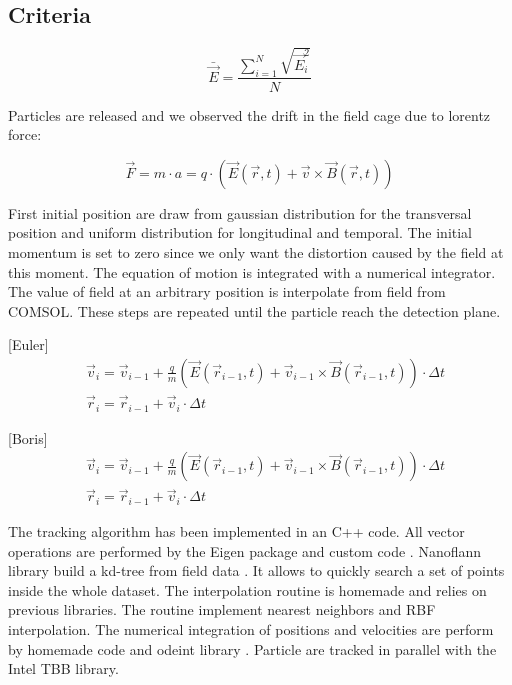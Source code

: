 \begin{refsection}
	\subsection{Criteria}

	\begin{equation}
		\bar{\vec{E}} = \frac{\sum_{i=1}^{N}\sqrt{\vec{E}_{i}^{2}}}{N}
	\end{equation}

	Particles are released and we observed the drift in the field cage due to lorentz force:

	\begin{equation}
		\vec{F} = m \cdot a = q \cdot (\vec{E}(\vec{r},t) + \vec{v} \times \vec{B}(\vec{r},t))
	\end{equation}

	First initial position are draw from gaussian distribution for the transversal position and uniform distribution for longitudinal and temporal. The initial momentum is set to zero since we only want the distortion caused by the field at this moment. The equation of motion is integrated with a numerical integrator. The value of field at an arbitrary position is interpolate from field from COMSOL. These steps are repeated until the particle reach the detection plane.

	[Euler]
	\begin{align}
		 & \vec{v}_{i} = \vec{v}_{i-1} + \frac{q}{m}(\vec{E}(\vec{r}_{i-1},t) + \vec{v}_{i-1} \times \vec{B}(\vec{r}_{i-1},t)) \cdot \Delta t \\
		 & \vec{r}_{i} = \vec{r}_{i-1} + \vec{v}_{i} \cdot \Delta t
	\end{align}

	[Boris]
	\begin{align}
		 & \vec{v}_{i} = \vec{v}_{i-1} + \frac{q}{m}(\vec{E}(\vec{r}_{i-1},t) + \vec{v}_{i-1} \times \vec{B}(\vec{r}_{i-1},t)) \cdot \Delta t \\
		 & \vec{r}_{i} = \vec{r}_{i-1} + \vec{v}_{i} \cdot \Delta t
	\end{align}

	

	The tracking algorithm has been implemented in an C++ code. All vector operations are performed by the Eigen package and custom code \cite{eigenweb}. Nanoflann library build a kd-tree from field data \cite{blanco2014nanoflann}. It allows to quickly search a set of points inside the whole dataset. The interpolation routine is homemade and relies on previous libraries. The routine implement nearest neighbors and RBF interpolation. The numerical integration of positions and velocities are perform by homemade code and odeint library \cite{Ahnert2011,Mulansky2014}. Particle are tracked in parallel with the Intel TBB library.


\end{refsection}
